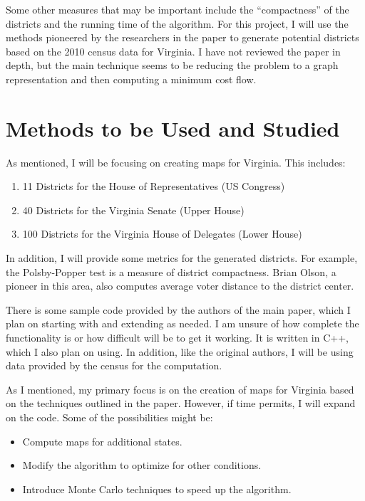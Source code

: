\documentclass[11pt]{article}
\begin{document}
Some other measures that may be important include the ``compactness'' of the districts and the running time of the algorithm. For this project, I will use the methods pioneered by the researchers in the paper to generate potential districts based on the 2010 census data for Virginia. I have not reviewed the paper in depth, but the main technique seems to be reducing the problem to a graph representation and then computing a minimum cost flow.

\section{Methods to be Used and Studied}

As mentioned, I will be focusing on creating maps for Virginia. This includes:
\begin{enumerate}
  \item 11 Districts for the House of Representatives (US Congress)
  \item 40 Districts for the Virginia Senate (Upper House)
  \item 100 Districts for the Virginia House of Delegates (Lower House)
\end{enumerate}

In addition, I will provide some metrics for the generated districts. For example, the Polsby-Popper test is a measure of district compactness\cite{polsby_popper}. Brian Olson, a pioneer in this area, also computes average voter distance to the district center.\cite{brian_olson}

There is some sample code provided by the authors of the main paper\cite{balanced_power_diagrams}, which I plan on starting with and extending as needed. I am unsure of how complete the functionality is or how difficult will be to get it working. It is written in C++, which I also plan on using. In addition, like the original authors, I will be using data provided by the census for the computation\cite{census_data}.

As I mentioned, my primary focus is on the creation of maps for Virginia based on the techniques outlined in the paper.\cite{balanced_power_diagrams} However, if time permits, I will expand on the code. Some of the possibilities might be:
\begin{itemize}
  \item Compute maps for additional states.
  \item Modify the algorithm to optimize for other conditions.
  \item Introduce Monte Carlo techniques to speed up the algorithm.
\end{itemize}
\end{document}
